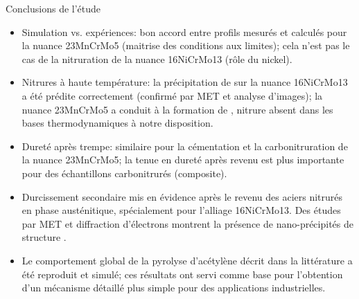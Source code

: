 \documentclass[aspectratio=169,pdf,t]{beamer}
\begin{document}
\begin{frame}{\insertsection}{Conclusions de l'étude}
  
  \begin{itemize}
		\item \alert<1->{Simulation vs. expériences: bon accord entre profils mesur\'es et calcul\'es pour la nuance 23MnCrMo5 (maitrise des conditions aux limites); cela n'est pas le cas de la nitruration de la nuance 16NiCrMo13 (r\^ole du nickel).}
		\vfill{}
		
		\item \alert<2->{Nitrures à haute température: la précipitation de  sur la nuance 16NiCrMo13 a été prédite correctement (confirmé par MET et analyse d'images); la nuance 23MnCrMo5 a conduit à la formation de , nitrure absent dans les bases thermodynamiques à notre disposition.}
		\vfill{}
		
		\item \alert<3->{Dureté après trempe: similaire pour la cémentation et la carbonitruration de la nuance 23MnCrMo5; la tenue en dureté après revenu est plus importante pour des échantillons carbonitrur\'es (composite).}
		\vfill{}
		
		\item \alert<4->{Durcissement secondaire mis en évidence après le revenu des aciers nitrurés en phase austénitique, spécialement pour l'alliage 16NiCrMo13. Des études par MET et diffraction d'électrons montrent la présence de nano-précipités de structure .}
		\vfill{}
		
		\item \alert<5->{Le comportement global de la pyrolyse d'acétylène décrit dans la littérature a été reproduit et simulé; ces résultats ont servi comme base pour l'obtention d'un mécanisme détaillé plus simple pour des applications industrielles.}
  \end{itemize}
\end{frame}
%
\end{document}
